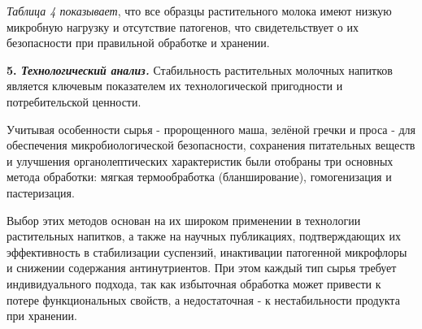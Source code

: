 
\emph{Таблица 4 показывает}, что все образцы растительного молока имеют
низкую микробную нагрузку и отсутствие патогенов, что свидетельствует о
их безопасности при правильной обработке и хранении.

{\bfseries 5. \emph{Технологический анализ.}} Стабильность растительных
молочных напитков является ключевым показателем их технологической
пригодности и потребительской ценности.

Учитывая особенности сырья - пророщенного маша, зелёной гречки и проса -
для обеспечения микробиологической безопасности, сохранения питательных
веществ и улучшения органолептических характеристик были отобраны три
основных метода обработки: мягкая термообработка (бланширование),
гомогенизация и пастеризация.

Выбор этих методов основан на их широком применении в технологии
растительных напитков, а также на научных публикациях, подтверждающих их
эффективность в стабилизации суспензий, инактивации патогенной
микрофлоры и снижении содержания антинутриентов. При этом каждый тип
сырья требует индивидуального подхода, так как избыточная обработка
может привести к потере функциональных свойств, а недостаточная - к
нестабильности продукта при хранении.

